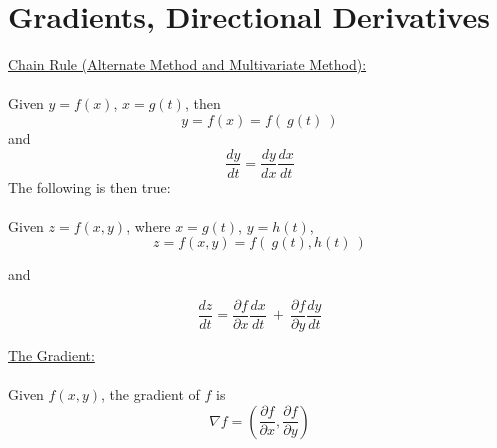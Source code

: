 \documentclass[12pt]{article}
\begin{document}
\maketitle

\section*{Gradients, Directional Derivatives}
\underline{Chain Rule (Alternate Method and Multivariate Method):}\\\\
Given $y= f(x)$, $x= g(t)$, then\\
$$
y = f(x) = f( \ g(t) \ )
$$
and
$$
\frac{dy}{dt} = \frac{dy}{dx} \frac{dx}{dt}
$$
The following is then true:\\\\
Given $z = f(x,y)$, where $x= g(t)$, $y= h(t)$,
$$
z = f(x,y) = f( \ g(t), h(t) \ )
$$

and

$$
\frac{dz}{dt} = \frac{\partial{f}}{\partial{x}} \frac{dx}{dt} \ + \ \frac{\partial{f}}{\partial{y}} \frac{dy}{dt}
$$

\noindent
\underline{The Gradient:}\\\\
Given $f(x,y)$, the gradient of $f$ is\\
$$
\nabla f = \left(\frac{\partial{f}}{\partial{x}},\frac{\partial{f}}{\partial{y}}\right)
$$
\end{document}
